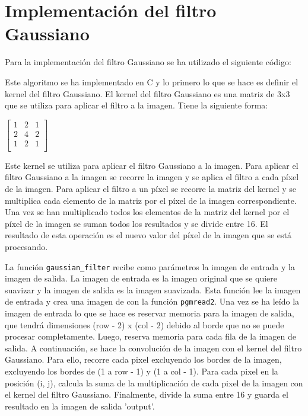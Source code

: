 \documentclass[11pt]{report}
\begin{document}
\section{Implementación del filtro Gaussiano}
Para la implementación del filtro Gaussiano se ha utilizado el siguiente código:
\lstset{style=mystyle}


Este algoritmo se ha implementado en C y lo primero lo que se hace es definir el kernel del filtro Gaussiano. El kernel del filtro
Gaussiano es una matriz de 3x3 que se utiliza para aplicar el filtro a la imagen. Tiene la siguiente forma:

\begin{center}
  $\left[
  \begin{array}{ccc}
    1 & 2 & 1 \\
    2 & 4 & 2 \\
    1 & 2 & 1 \\
  \end{array}
  \right]$
\end{center}

Este kernel se utiliza para aplicar el filtro Gaussiano a la imagen. Para aplicar el filtro Gaussiano a la imagen se recorre la imagen
y se aplica el filtro a cada píxel de la imagen. Para aplicar el filtro a un píxel se recorre la matriz del kernel y se multiplica cada
elemento de la matriz por el píxel de la imagen correspondiente. Una vez se han multiplicado todos los elementos de la matriz del kernel
por el píxel de la imagen se suman todos los resultados y se divide entre 16. El resultado de esta operación es el nuevo valor del píxel
de la imagen que se está procesando.

La función \texttt{gaussian\_filter} recibe como parámetros la imagen de entrada y la imagen de salida. La imagen de entrada es la imagen
original que se quiere suavizar y la imagen de salida es la imagen suavizada. Esta función lee la imagen de entrada y crea una imagen de con 
la función \texttt{pgmread2}. Una vez se ha leído la imagen de entrada lo que se hace es reservar memoria para la imagen de salida, que tendrá
dimensiones (row - 2) x (col - 2) debido al borde que no se puede procesar completamente. Luego, reserva memoria para cada fila de la imagen
de salida. A continuación, se hace la convolución de la imagen con el kernel del filtro Gaussiano. Para ello, recorre cada pixel excluyendo los 
bordes de la imagen, excluyendo los bordes de (1 a row - 1) y (1 a col - 1). Para cada pixel en la posición (i, j), calcula la suma de la
multiplicación de cada pixel de la imagen con el kernel del filtro Gaussiano. Finalmente, divide la suma entre 16 y guarda el resultado en la
imagen de salida 'output'. 
\end{document}
